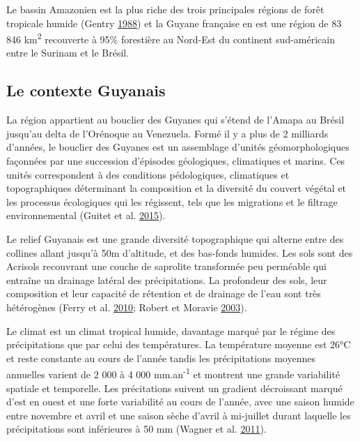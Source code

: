 \documentclass[11pt,french,A4paper,extrafontsizes,onecolumn,openright]{memoir}
\begin{document}
Le bassin Amazonien est la plus riche des trois principales régions de
forêt tropicale humide (Gentry \protect\hyperlink{ref-Gentry1988}{1988})
et la Guyane française en est une région de 83 846 km\textsuperscript{2}
recouverte à 95\% forestière au Nord-Est du continent sud-américain
entre le Surinam et le Brésil.

\subsection{Le contexte Guyanais}\label{le-contexte-guyanais}

La région appartient au bouclier des Guyanes qui s'étend de l'Amapa au
Brésil jusqu'au delta de l'Orénoque au Venezuela. Formé il y a plus de 2
milliards d'années, le bouclier des Guyanes est un assemblage d'unités
géomorphologiques façonnées par une succession d'épisodes géologiques,
climatiques et marins. Ces unités correspondent à des conditions
pédologiques, climatiques et topographiques déterminant la composition
et la diversité du couvert végétal et les processus écologiques qui les
régissent, tels que les migrations et le filtrage environnemental
(Guitet et al. \protect\hyperlink{ref-Guitet2015}{2015}).

Le relief Guyanais est une grande diversité topographique qui alterne
entre des collines allant jusqu'à 50m d'altitude, et des bas-fonds
humides. Les sols sont des Acrisols recouvrant une couche de saprolite
transformée peu perméable qui entraîne un drainage latéral des
précipitations. La profondeur des sols, leur composition et leur
capacité de rétention et de drainage de l'eau sont très hétérogènes
(Ferry et al. \protect\hyperlink{ref-Ferry2010}{2010}; Robert et Moravie
\protect\hyperlink{ref-Robert2003}{2003}).

Le climat est un climat tropical humide, davantage marqué par le régime
des précipitations que par celui des températures. La température
moyenne est 26°C et reste constante au cours de l'année tandis les
précipitations moyennes annuelles varient de 2 000 à 4 000
mm.an\textsuperscript{-1} et montrent une grande variabilité spatiale et
temporelle. Les précitations suivent un gradient décroissant marqué
d'est en ouest et une forte variabilité au cours de l'année, avec une
saison humide entre novembre et avril et une saison sèche d'avril à
mi-juillet durant laquelle les précipitations sont inférieures à 50 mm
(Wagner et al. \protect\hyperlink{ref-Wagner2011}{2011}).
\end{document}
